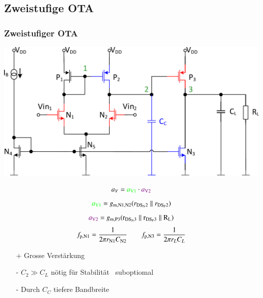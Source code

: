 \subsection{Zweistufige OTA}

\subsubsection{Zweistufiger OTA}

\begin{minipage}[t]{0.5\columnwidth}
    \includegraphics[width=\columnwidth, align=t]{images/11_OTA_zweistufig.pdf}
\end{minipage}
\hfill
\begin{minipage}[t]{0.48\columnwidth}
    \[
        a_V = {\color{green}a_{\rm V1}} \cdot {\color{violet}a_{\rm V2}} 
    \]
    \[
        {\color{green}a_{\rm V1}} = g_{\rm m, N1, N2} (r_{\rm DS_N2} \parallel r_{\rm DS_P2})
    \]
    \[
        {\color{violet}a_{\rm V2}} = g_{\rm m, P3} (\rm r_{DS_N3} \parallel r_{\rm DS_P3} \parallel R_L)
    \]
    \[
        f_{\rm p,N1} = \frac{1}{2\pi r_{\rm N1} C_{\rm N2}} \qquad f_{\rm p,N3} = \frac{1}{2\pi r_{L} C_{L}}
    \]
\end{minipage}

\smallskip

\begin{minipage}[t]{0.35\columnwidth}
    \begin{itemize}
        \item[+] Grosse Verstärkung
    \end{itemize}
\end{minipage}
\hfill
\begin{minipage}[t]{0.63\columnwidth}
    \begin{itemize}
        \item[-] $C_2 \gg C_L$ nötig für Stabilität \textrightarrow\ suboptiomal
        \item[-] Durch $C_C$ tiefere Bandbreite
    \end{itemize}
\end{minipage}



